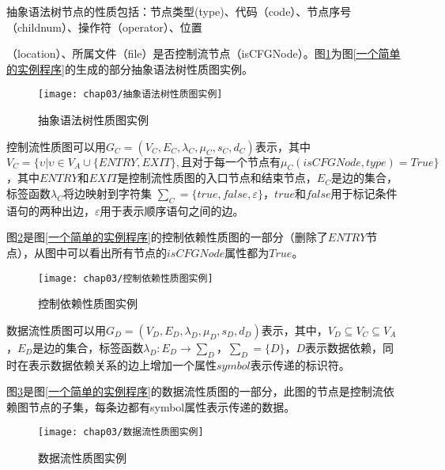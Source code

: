 抽象语法树节点的性质包括：节点类型{(type)}、代码{（code）}、节点序号{（childnum）}、操作符{（operator）}、位置{（location）、所属文件{（file）}是否控制流节点{（isCFGNode）}。图\ref{抽象语法树性质图实例}为图\ref{一个简单的实例程序}的生成的部分抽象语法树性质图实例。

\begin{figure}[htp]
\centering
\texttt{[image: chap03/抽象语法树性质图实例]}
\caption{抽象语法树性质图实例}
\label{抽象语法树性质图实例}
\end{figure}

\begin{definition}
\label{控制流性质图定义}
控制流性质图可以用$G _{C}=(V_{C},E_{C},\lambda _{C}, \mu _{C}, s _{C}, d _{C})$表示，其中$V_{C}=\{ \upsilon | \upsilon \in V_{A} \cup \{ENTRY,EXIT\},\text{且} 对于每一个节点有\mu_C(isCFGNode, type)=True \}$，其中$ENTRY$和$EXIT$是控制流性质图的入口节点和结束节点，$E_{C}$是边的集合，标签函数$\lambda_C$将边映射到字符集 $\sum_C=\{true, false, \varepsilon \}$，$true$和$false$用于标记条件语句的两种出边，$\varepsilon$用于表示顺序语句之间的边。
\end{definition}

图\ref{控制依赖性质图实例}是图\ref{一个简单的实例程序}的控制依赖性质图的一部分（删除了$ENTRY$节点），从图中可以看出所有节点的$isCFGNode$属性都为$True$。

\begin{figure}[htp]
\centering
\texttt{[image: chap03/控制依赖性质图实例]}
\caption{控制依赖性质图实例}
\label{控制依赖性质图实例}
\end{figure}

\begin{definition}
\label{数据流性质图定义}
数据流性质图可以用$G _{D}=(V_{D},E_{D},\lambda _{D}, \mu _{D}, s _{D}, d _{D})$表示，其中，$V_{D} \subseteq V_C \subseteq V_A$，$E_{D}$是边的集合，标签函数$\lambda_{D} : E_{D} \rightarrow \sum_{D}$，$\sum_{D} = \{D\}$，$D$表示数据依赖，同时在表示数据依赖关系的边上增加一个属性$symbol$表示传递的标识符。
\end{definition}

图\ref{数据流性质图实例}是图\ref{一个简单的实例程序}的数据流性质图的一部分，此图的节点是控制流依赖图节点的子集，每条边都有symbol属性表示传递的数据。

\begin{figure}[htp]
\centering
\texttt{[image: chap03/数据流性质图实例]}
\caption{数据流性质图实例}
\label{数据流性质图实例}
\end{figure}

}
